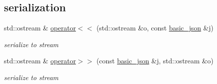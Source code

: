 \subsection*{serialization}
\begin{DoxyCompactItemize}
\item 
std\+::ostream \& \hyperlink{a00025_a5e34c5435e557d0bf666bd7311211405}{operator$<$$<$} (std\+::ostream \&o, const \hyperlink{a00025}{basic\+\_\+json} \&j)
\begin{DoxyCompactList}\small\item\em serialize to stream \end{DoxyCompactList}\item 
std\+::ostream \& \hyperlink{a00025_a34d6a60dd99e9f33b8273a1c8db5669b}{operator$>$$>$} (const \hyperlink{a00025}{basic\+\_\+json} \&j, std\+::ostream \&o)
\begin{DoxyCompactList}\small\item\em serialize to stream \end{DoxyCompactList}\end{DoxyCompactItemize}
